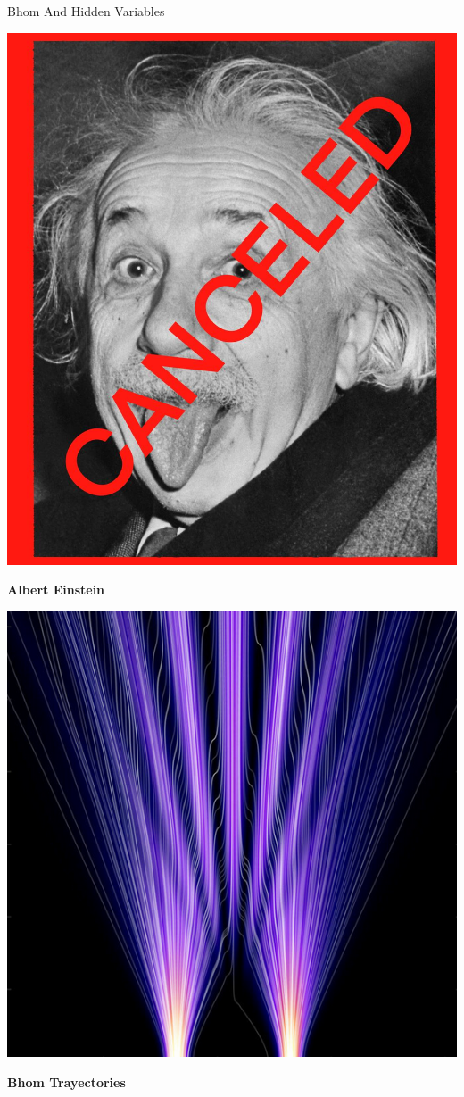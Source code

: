 \begin{frame}{Bhom And Hidden Variables}
  \begin{minipage}{0.48\textwidth}
    \centering
    \includegraphics[width=0.8\linewidth]{images/einstein.jpeg}
    \par\vspace{0.2cm}
    \textbf{Albert Einstein}
  \end{minipage}
  \hfill
  \begin{minipage}{0.48\textwidth}
    \centering
    \includegraphics[width=0.9\linewidth]{images/Bhom.png}
    \par\vspace{0.2cm}
    \textbf{Bhom Trayectories}
  \end{minipage}
\end{frame}


